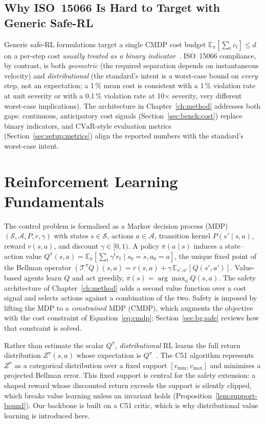 \documentclass[11pt,a4paper]{report}
\newcommand{\iso}{ISO~15066}
\newcommand{\cvar}{\ensuremath{\mathrm{CVaR}}}
\begin{document}
\subsection{Why \iso{} Is Hard to Target with Generic Safe-RL}
\label{sec:bg:iso:hard}

Generic safe-RL formulations target a single CMDP cost budget
$\mathbb{E}_{\pi}[\sum_t c_t] \le d$ on a per-step cost
\emph{usually treated as a binary indicator}~\cite{ray2019safetygym,
achiam2017cpo,stooke2020pid,he2023autocost,ji2023safetygymnasium}.
\iso{} compliance, by contrast, is
both \emph{geometric} (the required separation depends on
instantaneous velocity) and \emph{distributional} (the standard's
intent is a worst-case bound on \emph{every} step, not an
expectation; a 1\,\% mean cost is consistent with a 1\,\% violation
rate at unit severity or with a 0.1\,\% violation rate at
10$\times$ severity, very different worst-case implications).
The architecture in Chapter~\ref{ch:method} addresses both gaps:
continuous, anticipatory cost signals
(Section~\ref{sec:bench:cost}) replace binary indicators, and
\cvar-style evaluation metrics (Section~\ref{sec:setup:metrics})
align the reported numbers with the standard's worst-case intent.

\section{Reinforcement Learning Fundamentals}
\label{sec:bg:rl}

The control problem is formalised as a Markov decision process (MDP)
$(\mathcal{S}, \mathcal{A}, P, r, \gamma)$ with states $s \in
\mathcal{S}$, actions $a \in \mathcal{A}$, transition kernel
$P(s' \mid s, a)$, reward $r(s,a)$, and discount $\gamma \in [0,1)$. A
policy $\pi(a \mid s)$ induces a state--action value
$Q^{\pi}(s,a) = \mathbb{E}_{\pi}[\sum_t \gamma^t r_t \mid s_0 = s, a_0 =
a]$, the unique fixed point of the Bellman operator
$(\mathcal{T}^{\pi} Q)(s,a) = r(s,a) + \gamma\,
\mathbb{E}_{s',a'}[Q(s',a')]$. Value-based agents learn $Q$ and act
greedily, $\pi(s) = \arg\max_a Q(s,a)$. The safety architecture of
Chapter~\ref{ch:method} adds a second value function over a cost signal
and selects actions against a combination of the two. Safety is imposed
by lifting the MDP to a \emph{constrained} MDP (CMDP), which augments
the objective with the cost constraint of Equation~\ref{eq:cmdp};
Section~\ref{sec:bg:safe} reviews how that constraint is solved.

Rather than estimate the scalar $Q^{\pi}$, \emph{distributional} RL
learns the full return distribution $Z^{\pi}(s,a)$ whose expectation is
$Q^{\pi}$~\cite{bellemare2017c51}. The C51 algorithm represents
$Z^{\pi}$ as a categorical distribution over a fixed support
$[v_{\min}, v_{\max}]$ and minimises a projected Bellman error. This
fixed support is central for the safety extension: a shaped reward
whose discounted return exceeds the support is silently clipped, which
breaks value learning unless an invariant holds
(Proposition~\ref{lem:support-bound}). Our backbone is built on a C51
critic, which is why distributional value learning is introduced here.
\end{document}
